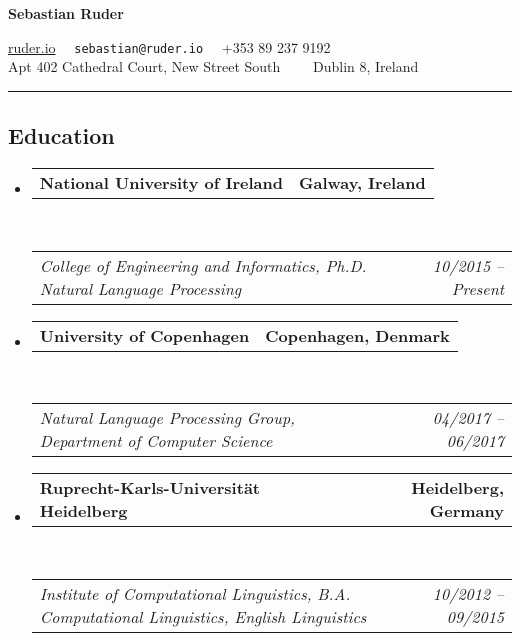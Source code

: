 \documentclass[10pt,letterpaper]{article}
\makeatletter
\newcommand{\headerrow}[2]
{\begin{tabular*}{\linewidth}{l@{\extracolsep{\fill}}r}
	#1 &
	#2 \\
\end{tabular*}}
\makeatother
\begin{document}
\begin{center}
{\LARGE \textbf{Sebastian Ruder}}

\url{ruder.io} \textbullet
\ \ \texttt{sebastian@ruder.io} \textbullet
\ \ +353 89 237 9192 
\\
Apt 402 Cathedral Court, New Street South\ \ \textbullet
\ \ Dublin 8, Ireland
\end{center}


\hrule
\vspace{-0.4em}
\subsection*{Education}

\begin{itemize}
	\parskip=0.1em
	
	\item 
	\headerrow
		{\textbf{National University of Ireland}}
		{\textbf{Galway, Ireland}}
	\\
	\headerrow
		{\emph{College of Engineering and Informatics, Ph.D. Natural Language Processing}}
		{\emph{10/2015 -- Present}}
	
	\item 
	\headerrow
		{\textbf{University of Copenhagen}}
		{\textbf{Copenhagen, Denmark}}
	\\
	\headerrow
		{\emph{Natural Language Processing Group, Department of Computer Science}}
		{\emph{04/2017 -- 06/2017}}

	\item 
	\headerrow
		{\textbf{Ruprecht-Karls-Universität Heidelberg}}
		{\textbf{Heidelberg, Germany}}
	\\
	\headerrow
		{\emph{Institute of Computational Linguistics, B.A. Computational Linguistics, English Linguistics}}
		{\emph{10/2012 -- 09/2015}}
	

\end{itemize}
\end{document}
